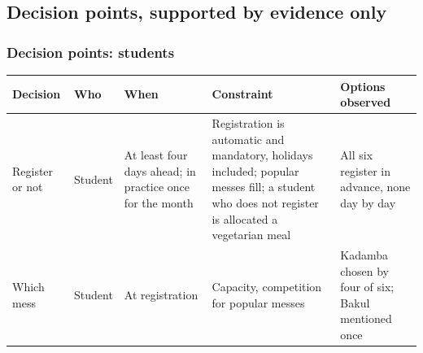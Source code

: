 \documentclass[
  10pt,
  table]{article}
\newcounter{none} %
\begin{document}
\subsection{Decision points, supported by evidence only}\label{decision-points-supported-by-evidence-only}

\subsubsection{Decision points: students}\label{decision-points-students}

{\def\LTcaptype{none} %
\begin{longtable}[]{@{}
  >{\raggedright\arraybackslash}p{}
  >{\raggedright\arraybackslash}p{}
  >{\raggedright\arraybackslash}p{}
  >{\raggedright\arraybackslash}p{}
  >{\raggedright\arraybackslash}p{}@{}}
\toprule\noalign{}
\begin{minipage}[b]{\linewidth}\raggedright
\cellcolor{pblue}\color{white}\bfseries Decision
\end{minipage} & \begin{minipage}[b]{\linewidth}\raggedright
\cellcolor{pblue}\color{white}\bfseries Who
\end{minipage} & \begin{minipage}[b]{\linewidth}\raggedright
\cellcolor{pblue}\color{white}\bfseries When
\end{minipage} & \begin{minipage}[b]{\linewidth}\raggedright
\cellcolor{pblue}\color{white}\bfseries Constraint
\end{minipage} & \begin{minipage}[b]{\linewidth}\raggedright
\cellcolor{pblue}\color{white}\bfseries Options observed
\end{minipage} \\
\midrule\noalign{}
\endhead
\bottomrule\noalign{}
\endlastfoot
Register or not & Student & At least four days ahead; in practice once for the month & Registration is automatic and mandatory, holidays included; popular messes fill; a student who does not register is allocated a vegetarian meal & All six register in advance, none day by day \\
Which mess & Student & At registration & Capacity, competition for popular messes & Kadamba chosen by four of six; Bakul mentioned once \\

\end{longtable}}
\end{document}
